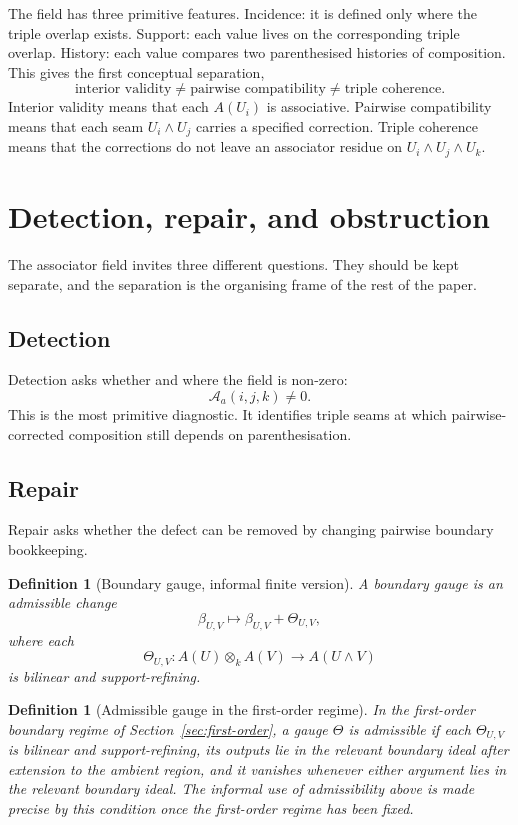 \documentclass[11pt]{article}
\newtheorem{definition}[theorem]{Definition}
\begin{document}
The field has three primitive features. Incidence: it is defined only where the triple overlap exists. Support: each value lives on the corresponding triple overlap. History: each value compares two parenthesised histories of composition. This gives the first conceptual separation,
\[
\text{interior validity}\neq \text{pairwise compatibility}\neq \text{triple coherence}.
\]
Interior validity means that each \(A(U_i)\) is associative. Pairwise compatibility means that each seam \(U_i\wedge U_j\) carries a specified correction. Triple coherence means that the corrections do not leave an associator residue on \(U_i\wedge U_j\wedge U_k\).

\section{Detection, repair, and obstruction}
\label{sec:dro}

The associator field invites three different questions. They should be kept separate, and the separation is the organising frame of the rest of the paper.

\subsection{Detection}

Detection asks whether and where the field is non-zero:
\[
\mathcal A_a(i,j,k)\neq 0.
\]
This is the most primitive diagnostic. It identifies triple seams at which pairwise-corrected composition still depends on parenthesisation.

\subsection{Repair}

Repair asks whether the defect can be removed by changing pairwise boundary bookkeeping.

\begin{definition}[Boundary gauge, informal finite version]
A boundary gauge is an admissible change
\[
\beta_{U,V}\longmapsto \beta_{U,V}+\Theta_{U,V},
\]
where each
\[
\Theta_{U,V}:A(U)\otimes_k A(V)\to A(U\wedge V)
\]
is bilinear and support-refining.
\end{definition}

\begin{definition}[Admissible gauge in the first-order regime]
In the first-order boundary regime of Section~\ref{sec:first-order}, a gauge \(\Theta\) is admissible if each \(\Theta_{U,V}\) is bilinear and support-refining, its outputs lie in the relevant boundary ideal after extension to the ambient region, and it vanishes whenever either argument lies in the relevant boundary ideal. The informal use of admissibility above is made precise by this condition once the first-order regime has been fixed.
\end{definition}
\end{document}
